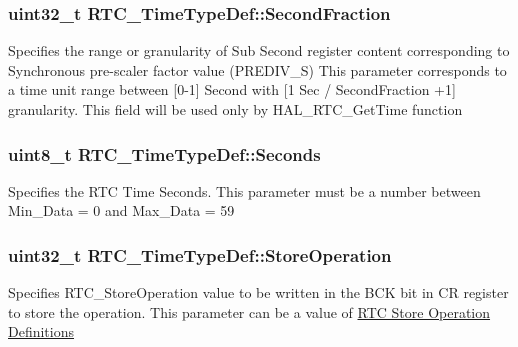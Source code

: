 \subsubsection[{\texorpdfstring{Second\+Fraction}{SecondFraction}}]{\setlength{\rightskip}{0pt plus 5cm}uint32\+\_\+t R\+T\+C\+\_\+\+Time\+Type\+Def\+::\+Second\+Fraction}\hypertarget{struct_r_t_c___time_type_def_ab9e6aabb125b82b1e25cd1070a2d2ecb}{}\label{struct_r_t_c___time_type_def_ab9e6aabb125b82b1e25cd1070a2d2ecb}
Specifies the range or granularity of Sub Second register content corresponding to Synchronous pre-\/scaler factor value (P\+R\+E\+D\+I\+V\+\_\+S) This parameter corresponds to a time unit range between \mbox{[}0-\/1\mbox{]} Second with \mbox{[}1 Sec / Second\+Fraction +1\mbox{]} granularity. This field will be used only by H\+A\+L\+\_\+\+R\+T\+C\+\_\+\+Get\+Time function 
\subsubsection[{\texorpdfstring{Seconds}{Seconds}}]{\setlength{\rightskip}{0pt plus 5cm}uint8\+\_\+t R\+T\+C\+\_\+\+Time\+Type\+Def\+::\+Seconds}\hypertarget{struct_r_t_c___time_type_def_a297ae76c2b7de4f939d996d93240c6b2}{}\label{struct_r_t_c___time_type_def_a297ae76c2b7de4f939d996d93240c6b2}
Specifies the R\+TC Time Seconds. This parameter must be a number between Min\+\_\+\+Data = 0 and Max\+\_\+\+Data = 59 
\subsubsection[{\texorpdfstring{Store\+Operation}{StoreOperation}}]{\setlength{\rightskip}{0pt plus 5cm}uint32\+\_\+t R\+T\+C\+\_\+\+Time\+Type\+Def\+::\+Store\+Operation}\hypertarget{struct_r_t_c___time_type_def_a7628b757d7c7a4ab30b6bbc45a028b7d}{}\label{struct_r_t_c___time_type_def_a7628b757d7c7a4ab30b6bbc45a028b7d}
Specifies R\+T\+C\+\_\+\+Store\+Operation value to be written in the B\+CK bit in CR register to store the operation. This parameter can be a value of \hyperlink{group___r_t_c___store_operation___definitions}{R\+TC Store Operation Definitions} 
